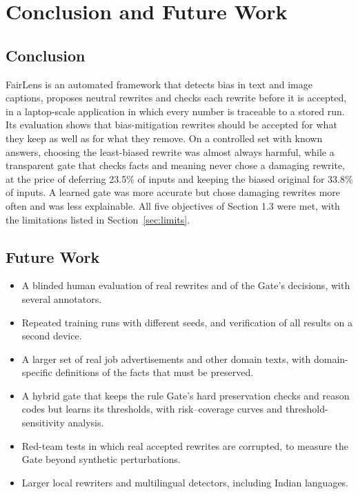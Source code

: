 \documentclass[12pt,a4paper,oneside]{report}
\begin{document}
\chapter{Conclusion and Future Work}\label{ch:conc}

\section{Conclusion}
FairLens is an automated framework that detects bias in text and image captions, proposes neutral rewrites and checks
each rewrite before it is accepted, in a laptop-scale application in which every number is traceable to a stored run.
Its evaluation shows that bias-mitigation rewrites should be accepted for what they keep as well as for what they
remove. On a controlled set with known answers, choosing the least-biased rewrite was almost always harmful, while a
transparent gate that checks facts and meaning never chose a damaging rewrite, at the price of deferring 23.5\% of inputs
and keeping the biased original for 33.8\% of inputs. A learned gate was more accurate but chose damaging rewrites more
often and was less explainable. All five objectives of Section 1.3 were met, with the limitations listed in
Section~\ref{sec:limits}.

\section{Future Work}
\begin{itemize}
\item A blinded human evaluation of real rewrites and of the Gate's decisions, with several annotators.
\item Repeated training runs with different seeds, and verification of all results on a second device.
\item A larger set of real job advertisements and other domain texts, with domain-specific definitions of the facts that
must be preserved.
\item A hybrid gate that keeps the rule Gate's hard preservation checks and reason codes but learns its thresholds,
with risk--coverage curves and threshold-sensitivity analysis.
\item Red-team tests in which real accepted rewrites are corrupted, to measure the Gate beyond synthetic perturbations.
\item Larger local rewriters and multilingual detectors, including Indian languages.
\end{itemize}
\end{document}
